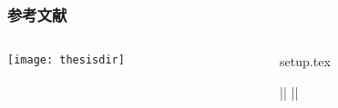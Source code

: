 \begin{frame}[fragile]
  \frametitle{参考文献}
  \begin{columns}
    \begin{column}{0.45\textwidth}
      \texttt{[image: thesisdir]}
    \end{column}
    \begin{column}{0.55\textwidth}
      \begin{codeblock}[firstnumber=111,numbersep=2pt]{setup.tex}
\usepackage[backend=biber,style=gb7714-2015]{biblatex}
\setlength{\bibitemsep}{0pt}
|\highlightline|%
|\highlightline|
      \end{codeblock}
    \end{column}
  \end{columns}
\end{frame}
